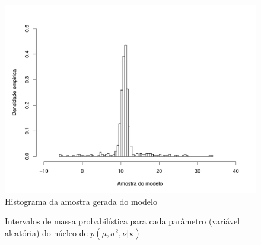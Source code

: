 \documentclass[9pt]{beamer}
\begin{document}
\begin{frame}
\begin{figure}[htb]
	\centering
	\includegraphics[scale=0.5]{amostra_n.pdf}
	\caption{Histograma da amostra gerada do modelo}
	\label{fig:sample_n.pdf}
\end{figure}
\end{frame}
\begin{frame}
\begin{figure}[htb]\footnotesize
	\centering
\caption{Intervalos de massa probabilística para cada parâmetro (variável aleatória) do núcleo de $p(\mu, \sigma^2, \nu | \bm{x})$}%
\end{figure}
\end{frame}
\end{document}
